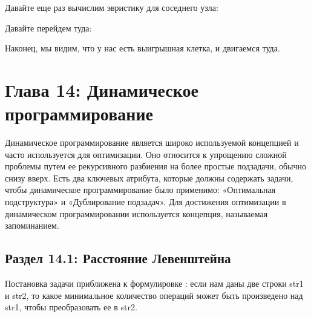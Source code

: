 Давайте еще раз  вычислим эвристику для соседнего узла: 

\vspace{\baselineskip}


Давайте перейдем туда: 

\vspace{\baselineskip}


Наконец, мы видим, что у нас есть выигрышная клетка, и двигаемся туда.

\newpage
\chapter*{Глава 14: Динамическое программирование }
Динамическое программирование является широко используемой концепцией и часто используется для оптимизации. Оно относится к упрощению сложной проблемы путем ее рекурсивного разбиения на более простые подзадачи, обычно снизу вверх. Есть два ключевых атрибута, которые должны содержать задачи, чтобы динамическое программирование было применимо: «Оптимальная подструктура» и «Дублирование подзадач». Для достижения оптимизации в динамическом программировании используется концепция, называемая запоминанием.
\section*{Раздел 14.1: Расстояние Левенштейна}
Постановка задачи приближена к формулировке : если нам даны две строки str1 и str2, то какое минимальное количество операций может быть произведено над  str1, чтобы преобразовать ее в str2.

\vspace{\baselineskip}

